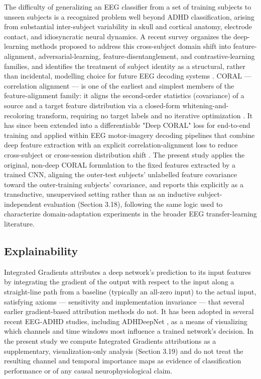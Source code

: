 \documentclass[a4paper,fleqn]{cas-sc}
\begin{document}
The difficulty of generalizing an EEG classifier from a set of training subjects to unseen subjects is a recognized problem well beyond ADHD classification, arising from substantial inter-subject variability in skull and cortical anatomy, electrode contact, and idiosyncratic neural dynamics. A recent survey organizes the deep-learning methods proposed to address this cross-subject domain shift into feature-alignment, adversarial-learning, feature-disentanglement, and contrastive-learning families, and identifies the treatment of subject identity as a structural, rather than incidental, modelling choice for future EEG decoding systems \cite{li2026crosssubject}. CORAL --- correlation alignment --- is one of the earliest and simplest members of the feature-alignment family: it aligns the second-order statistics (covariance) of a source and a target feature distribution via a closed-form whitening-and-recoloring transform, requiring no target labels and no iterative optimization \cite{sun2016return}. It has since been extended into a differentiable "Deep CORAL" loss for end-to-end training and applied within EEG motor-imagery decoding pipelines that combine deep feature extraction with an explicit correlation-alignment loss to reduce cross-subject or cross-session distribution shift \cite{zhong2023deep}. The present study applies the original, non-deep CORAL formulation to the fixed features extracted by a trained CNN, aligning the outer-test subjects' unlabelled feature covariance toward the outer-training subjects' covariance, and reports this explicitly as a transductive, unsupervised setting rather than as an inductive subject-independent evaluation (Section 3.18), following the same logic used to characterize domain-adaptation experiments in the broader EEG transfer-learning literature.



\subsection{Explainability}

Integrated Gradients \cite{sundararajan2017axiomatic} attributes a deep network's prediction to its input features by integrating the gradient of the output with respect to the input along a straight-line path from a baseline (typically an all-zero input) to the actual input, satisfying axioms --- sensitivity and implementation invariance --- that several earlier gradient-based attribution methods do not. It has been adopted in several recent EEG-ADHD studies, including ADHDeepNet \cite{amini2025adhdeepnet}, as a means of visualizing which channels and time windows most influence a trained network's decision. In the present study we compute Integrated Gradients attributions as a supplementary, visualization-only analysis (Section 3.19) and do not treat the resulting channel and temporal importance maps as evidence of classification performance or of any causal neurophysiological claim.
\end{document}
